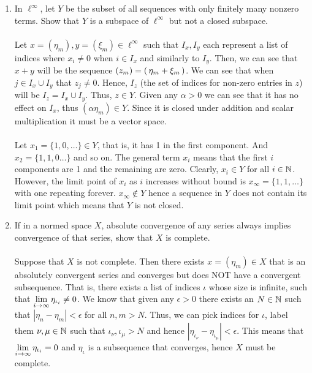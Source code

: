 \documentclass[10pt,a4paper]{report}
\begin{document}
\begin{enumerate}
	\item In $\ell^\infty$, let $Y$ be the subset of all sequences with only finitely many nonzero terms.  Show that $Y$ is a subspace of $\ell^\infty$ but not a closed subspace. \\
	\\
	Let $x = (\eta_m), y=(\xi_m) \in \ell^\infty$ such that $I_x, I_y$ each represent a list of indices where $x_i \ne 0$ when $i \in I_x$ and similarly to $I_y$.  Then, we can see that $x+y$ will be the sequence $(z_m) = \left (\, \eta_m + \xi_m \,\right )$.  We can see that when $j \in I_x \cup I_y$ that $z_j \ne 0$.  Hence, $I_z$ (the set of indices for non-zero entries in $z$) will be $I_z=I_x\cup I_y$.  Thus, $z \in Y$.  Given any $\alpha > 0$ we can see that it has no effect on $I_x$, thus $(\alpha \eta_m) \in Y$.  Since it is closed under addition and scalar multiplication it must be a vector space.\\
	\\
	Let $x_1= \{1,0,\dots \} \in Y$, that is, it has 1 in the first component.  And $x_2 = \{1,1,0\dots\}$ and so on.  The general term $x_i$ means that the first $i$ components are 1 and the remaining are zero.  Clearly, $x_i \in Y$ for all $i\in\mathbb{N}$.  However, the limit point of $x_i$ as $i$ increases without bound is $x_\infty=\{1, 1, \dots\}$ with one repeating forever.  $x_\infty \not \in Y$ hence a sequence in $Y$ does not contain its limit point which means that $Y$ is not closed.
	\\
	
	\setcounter{enumi}{7}
	\item If in a normed space $X$, absolute convergence of any series always implies convergence of that series, show that $X$ is complete.\\
	\\
	Suppose that $X$ is not complete.  Then there exists $x = (\eta_m) \in X$ that is an absolutely convergent series and converges but does NOT have a convergent subsequence.  That is, there exists a list of indices $\iota$ whose size is infinite, such that $\underset{i\to\infty}\lim\, \eta_{\iota_i} \ne 0$.  We know that given any $\epsilon > 0$ there exists an $N \in \mathbb{N}$ such that $|\eta_n - \eta_m| < \epsilon$ for all $n,m > N$.  Thus, we can pick indices for $\iota$, label them $\nu, \mu \in \mathbb{N}$ such that $\iota_\nu, \iota_\mu > N$ and hence $|\eta_{\iota_\nu}-\eta_{\iota_\mu}| < \epsilon$.  This means that $\underset{i\to\infty}\lim\, \eta_{\iota_i} = 0$ and $\eta_\iota$ is a subsequence that converges, hence $X$ must be complete.
	

\end{enumerate}
\end{document}
